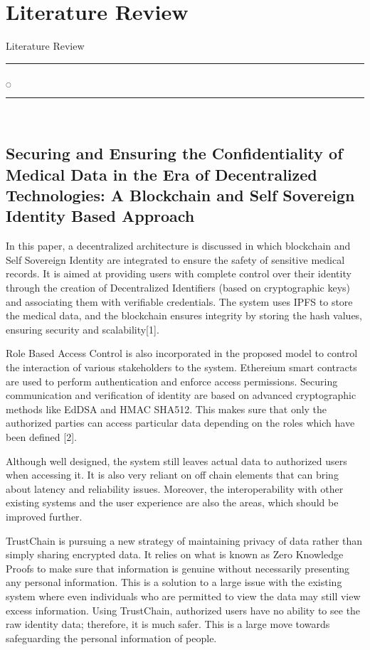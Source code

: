 

\chapter[Literature Review]{Literature Review}{Literature Review}\label{lit}
\noindent
\rule{0.49\textwidth}{0.75pt} $_{\bigcirc}$ \rule{0.49\textwidth}{0.75pt}\\

\begingroup
\linespread{0.8}\selectfont
\section{Securing and Ensuring the Confidentiality of Medical Data in the Era of Decentralized Technologies: A Blockchain and Self Sovereign Identity Based Approach}
\endgroup
In this paper, a decentralized architecture is discussed in which blockchain and Self Sovereign Identity are integrated to ensure the safety of sensitive medical records. It is aimed at providing users with complete control over their identity through the creation of Decentralized Identifiers (based on cryptographic keys) and associating them with verifiable credentials. The system uses IPFS to store the medical data, and the blockchain ensures integrity by storing the hash values, ensuring security and scalability[1].

Role Based Access Control is also incorporated in the proposed model to control the interaction of various stakeholders to the system. Ethereium smart contracts are used to perform authentication and enforce access permissions. Securing communication and verification of identity are based on advanced cryptographic methods like EdDSA and HMAC SHA512. This makes sure that only the authorized parties can access particular data depending on the roles which have been defined [2].

Although well designed, the system still leaves actual data to authorized users when accessing it. It is also very reliant on off chain elements that can bring about latency and reliability issues. Moreover, the interoperability with other existing systems and the user experience are also the areas, which should be improved further.

TrustChain is pursuing a new strategy of maintaining privacy of data rather than simply sharing encrypted data. It relies on what is known as Zero Knowledge Proofs to make sure that information is genuine without necessarily presenting any personal information. This is a solution to a large issue with the existing system where even individuals who are permitted to view the data may still view excess information. Using TrustChain, authorized users have no ability to see the raw identity data; therefore, it is much safer. This is a large move towards safeguarding the personal information of people.

